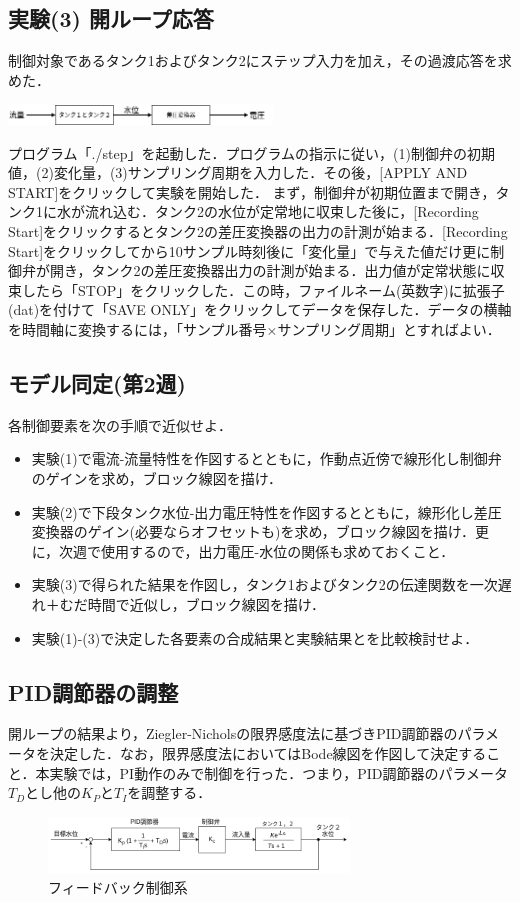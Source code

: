 \documentclass[12pt]{jsarticle}
\begin{document}
\subsection{実験(3) 開ループ応答}
制御対象であるタンク1およびタンク2にステップ入力を加え，その過渡応答を求めた．
\begin{center}
  \includegraphics[clip,width=7.0cm]{../img/OpenResponse.png}
\end{center}
プログラム「./step」を起動した．プログラムの指示に従い，(1)制御弁の初期値，(2)変化量，(3)サンプリング周期を入力した．その後，[APPLY AND START]をクリックして実験を開始した．
まず，制御弁が初期位置まで開き，タンク1に水が流れ込む．タンク2の水位が定常地に収束した後に，[Recording Start]をクリックするとタンク2の差圧変換器の出力の計測が始まる．[Recording Start]をクリックしてから10サンプル時刻後に「変化量」で与えた値だけ更に制御弁が開き，タンク2の差圧変換器出力の計測が始まる．出力値が定常状態に収束したら「STOP」をクリックした．この時，ファイルネーム(英数字)に拡張子(dat)を付けて「SAVE ONLY」をクリックしてデータを保存した．データの横軸を時間軸に変換するには，「サンプル番号×サンプリング周期」とすればよい．
\subsection{モデル同定(第2週)}
各制御要素を次の手順で近似せよ．
\begin{itemize}
\item 実験(1)で電流-流量特性を作図するとともに，作動点近傍で線形化し制御弁のゲインを求め，ブロック線図を描け．
\item 実験(2)で下段タンク水位-出力電圧特性を作図するとともに，線形化し差圧変換器のゲイン(必要ならオフセットも)を求め，ブロック線図を描け．更に，次週で使用するので，出力電圧-水位の関係も求めておくこと．
\item 実験(3)で得られた結果を作図し，タンク1およびタンク2の伝達関数を一次遅れ＋むだ時間で近似し，ブロック線図を描け．
\item 実験(1)-(3)で決定した各要素の合成結果と実験結果とを比較検討せよ．
\end{itemize}
\subsection{PID調節器の調整}
開ループの結果より，Ziegler-Nicholsの限界感度法に基づきPID調節器のパラメータを決定した．なお，限界感度法においてはBode線図を作図して決定すること．本実験では，PI動作のみで制御を行った．つまり，PID調節器のパラメータ$T_D$とし他の$K_P$と$T_I$を調整する．
\begin{figure}[tb]
  \begin{center}
    \includegraphics[clip,width=8.0cm]{../img/PIDController.png}
    \caption{フィードバック制御系}
    \label{FeedbackController}
  \end{center}
\end{figure}
\end{document}
